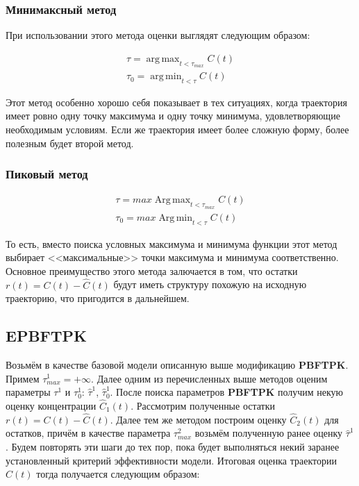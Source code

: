 \documentclass[12pt]{article}
\DeclareMathOperator*{\argmax}{arg\,max}
\DeclareMathOperator*{\argmin}{arg\,min}
\DeclareMathOperator*{\Argmax}{Arg\,max}
\DeclareMathOperator*{\Argmin}{Arg\,min}
\begin{document}
\subsubsection*{Минимаксный метод}

При использовании этого метода оценки выглядят следующим образом:

\begin{align*}
	\tau = \argmax_{t < \tau_{max}} C(t) \\
	\tau_0 = \argmin_{t < \tau} C(t)
\end{align*}

Этот метод особенно хорошо себя показывает в тех ситуациях, когда траектория имеет ровно одну точку максимума и одну точку минимума, удовлетворяющие необходимым условиям. Если же траектория имеет более сложную форму, более полезным будет второй метод.

\subsubsection*{Пиковый метод}

\begin{align*}
	\tau = max \Argmax_{t < \tau_{max}} C(t) \\
	\tau_0 = max \Argmin_{t < \tau} C(t)
\end{align*}

То есть, вместо поиска условных максимума и минимума функции этот метод выбирает <<максимальные>> точки максимума и минимума соответственно. Основное преимущество этого метода залючается в том, что остатки $r(t) = C(t) - \hat{C}(t)$ будут иметь структуру похожую на исходную траекторию, что пригодится в дальнейшем.

\subsection{EPBFTPK}

Возьмём в качестве базовой модели описанную выше модификацию \textbf{PBFTPK}. Примем $\tau_{max}^1 = +\infty$. Далее одним из перечисленных выше методов оценим параметры $\tau^1$ и $\tau_0^1$: $\hat{\tau}^1$, $\hat{\tau}_0^1$. После поиска параметров \textbf{PBFTPK} получим некую оценку концентрации $\hat{C}_1(t)$. Рассмотрим полученные остатки $r(t) = C(t) - \hat{C}(t)$. Далее тем же методом построим оценку $\hat{C}_2(t)$ для остатков, причём в качестве параметра $\tau_{max}^2$ возьмём полученную ранее оценку $\hat{\tau}^1$. Будем повторять эти шаги до тех пор, пока будет выполняться некий заранее установленный критерий эффективности модели. Итоговая оценка траектории $\hat{C}(t)$ тогда получается следующим образом:
\end{document}
